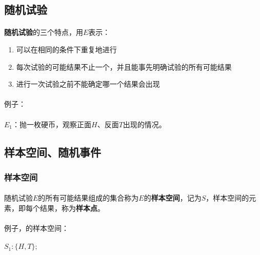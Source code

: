 \subsection{随机试验}
\paragraph{}
\textbf{随机试验}的三个特点，用$E$表示：

\begin{enumerate}
  \item 可以在相同的条件下重复地进行
  \item 每次试验的可能结果不止一个，并且能事先明确试验的所有可能结果
  \item 进行一次试验之前不能确定哪一个结果会出现
\end{enumerate}

\paragraph{}
例子：

\label{s1_1}
\paragraph{}
$E_1$：抛一枚硬币，观察正面$H$、反面$T$出现的情况。

\subsection{样本空间、随机事件}
\subsubsection{样本空间}
\paragraph{}

随机试验$E$的所有可能结果组成的集合称为$E$的\textbf{样本空间}，记为$S$，样本空间的元素，即每个结果，称为\textbf{样本点}。

\paragraph{}
例子，的样本空间：

\paragraph{}
$S_1: \{H, T\};$

